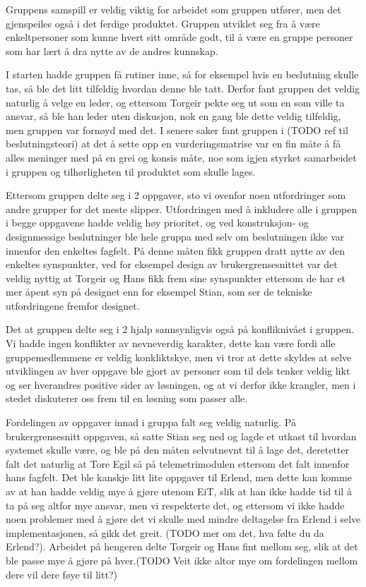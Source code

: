 Gruppens samspill er veldig viktig for arbeidet som gruppen utfører, men det gjenspeiles også i det ferdige produktet.
Gruppen utviklet seg fra å være enkeltpersoner som kunne hvert sitt område godt, til å være en gruppe personer som har lært å dra nytte av de andres kunnskap.

I starten hadde gruppen få rutiner inne, så for eksempel hvis en beslutning skulle tas, så ble det litt tilfeldig hvordan denne ble tatt. Derfor fant gruppen det veldig naturlig å velge en leder, og ettersom Torgeir pekte seg ut som en som ville ta ansvar, så ble han leder uten diskusjon, nok en gang ble dette veldig tilfeldig, men gruppen var fornøyd med det. I senere saker fant gruppen i (TODO ref til beslutningsteori) at det å sette opp en vurderingsmatrise var en fin måte å få alles meninger med på en grei og konsis måte, noe som igjen styrket samarbeidet i gruppen og tilhørligheten til produktet som skulle lages.

Ettersom gruppen delte seg i 2 oppgaver, sto vi ovenfor noen utfordringer som andre grupper for det meste slipper. Utfordringen med å inkludere alle i gruppen i begge oppgavene hadde veldig høy prioritet, og ved konstruksjon- og designmessige beslutninger ble hele gruppa med selv om beslutningen ikke var innenfor den enkeltes fagfelt. På denne måten fikk gruppen dratt nytte av den enkeltes synspunkter, ved for eksempel design av brukergrensesnittet var det veldig nyttig at Torgeir og Hans fikk frem sine synspunkter ettersom de har et mer åpent syn på designet enn for eksempel Stian, som ser de tekniske utfordringene fremfor designet.

Det at gruppen delte seg i 2 hjalp sannsynligvis også på konfliknivået i gruppen. Vi hadde ingen konflikter av nevneverdig karakter, dette kan være fordi alle gruppemedlemmene er veldig konkliktskye, men vi tror at dette skyldes at selve utviklingen av hver oppgave ble gjort av personer som til dels tenker veldig likt og ser hverandres positive sider av løsningen, og at vi derfor ikke krangler, men i stedet diskuterer oss frem til en løsning som passer alle.

Fordelingen av oppgaver innad i gruppa falt seg veldig naturlig. På brukergrensesnitt oppgaven, så satte Stian seg ned og lagde et utkast til hvordan systemet skulle være, og ble på den måten selvutnevnt til å lage det, deretetter falt det naturlig at Tore Egil så på telemetrimodulen ettersom det falt innenfor hans fagfelt. Det ble kanskje litt lite oppgaver til Erlend, men dette kan komme av at han hadde veldig mye å gjøre utenom EiT, slik at han ikke hadde tid til å ta på seg altfor mye ansvar, men vi respekterte det, og ettersom vi ikke hadde noen problemer med å gjøre det vi skulle med mindre deltagelse fra Erlend i selve implementasjonen, så gikk det greit. (TODO mer om det, hva følte du da Erlend?). Arbeidet på hengeren delte Torgeir og Hans fint mellom seg, slik at det ble passe mye å gjøre på hver.(TODO Veit ikke altor mye om fordelingen mellom dere vil dere føye til litt?)

